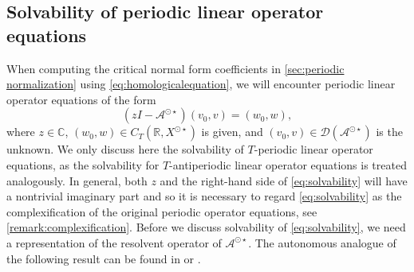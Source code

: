 \documentclass[english]{myarticle}
\begin{document}
\begin{sloppypar}
\subsection{Solvability of periodic linear operator equations} \label{subsec:solvability}
When computing the critical normal form coefficients in \cref{sec:periodic normalization} using \eqref{eq:homologicalequation}, we will encounter periodic linear operator equations of the form
\begin{equation} \label{eq:solvability}
    (zI - \mathcal{A}^{\odot \star})(v_0,v) = (w_0,w),
\end{equation}
where $z \in \mathbb{C}$, $(w_0,w) \in C_T(\mathbb{R},X^{\odot \star})$ is given, and $(v_0,v) \in \mathcal{D}(\mathcal{A}^{\odot \star})$ is the unknown. We only discuss here the solvability of $T$-periodic linear operator equations, as the solvability for $T$-antiperiodic linear operator equations is treated analogously. In general, both $z$ and the right-hand side of \eqref{eq:solvability} will have a nontrivial imaginary part and so it is necessary to regard \eqref{eq:solvability} as the complexification of the original periodic operator equations, see \cref{remark:complexification}. Before we discuss solvability of \eqref{eq:solvability}, we need a representation of the resolvent operator of $\mathcal{A}^{\odot \star}$. The autonomous analogue of the following result can be found in \cite[Corollary IV.5.4]{Diekmann1995} or \cite[Lemma 3.3]{Janssens2010}.


\end{sloppypar}
\end{document}
